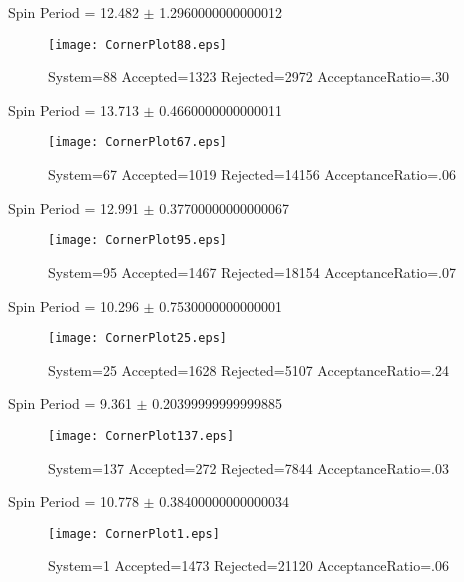 \documentclass[10pt]{article}
\begin{document}
\newpage
\begin{center}
        Spin Period = 12.482 $\pm$ 1.2960000000000012
        \end{center}
\begin{figure}[H] 
        \texttt{[image: CornerPlot88.eps]}
        \caption{System=88 Accepted=1323 Rejected=2972 AcceptanceRatio=.30}
        \label{S88}
        \centering
        \end{figure}
\newpage
\begin{center}
        Spin Period = 13.713 $\pm$ 0.4660000000000011
        \end{center}
\begin{figure}[H] 
        \texttt{[image: CornerPlot67.eps]}
        \caption{System=67 Accepted=1019 Rejected=14156 AcceptanceRatio=.06}
        \label{S67}
        \centering
        \end{figure}
\newpage
\begin{center}
        Spin Period = 12.991 $\pm$ 0.37700000000000067
        \end{center}
\begin{figure}[H] 
        \texttt{[image: CornerPlot95.eps]}
        \caption{System=95 Accepted=1467 Rejected=18154 AcceptanceRatio=.07}
        \label{S95}
        \centering
        \end{figure}
\newpage
\begin{center}
        Spin Period = 10.296 $\pm$ 0.7530000000000001
        \end{center}
\begin{figure}[H] 
        \texttt{[image: CornerPlot25.eps]}
        \caption{System=25 Accepted=1628 Rejected=5107 AcceptanceRatio=.24}
        \label{S25}
        \centering
        \end{figure}
\newpage
\begin{center}
        Spin Period = 9.361 $\pm$ 0.20399999999999885
        \end{center}
\begin{figure}[H] 
        \texttt{[image: CornerPlot137.eps]}
        \caption{System=137 Accepted=272 Rejected=7844 AcceptanceRatio=.03}
        \label{S137}
        \centering
        \end{figure}
\newpage
\begin{center}
        Spin Period = 10.778 $\pm$ 0.38400000000000034
        \end{center}
\begin{figure}[H] 
        \texttt{[image: CornerPlot1.eps]}
        \caption{System=1 Accepted=1473 Rejected=21120 AcceptanceRatio=.06}
        \label{S1}
        \centering
        \end{figure}
\end{document}
